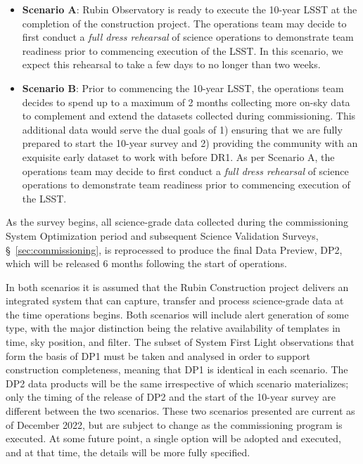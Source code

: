\begin{itemize}
\item \textbf{Scenario A}:
Rubin Observatory is ready to execute the 10-year LSST at the completion of the construction project. 
The operations team may decide to first conduct a \textit{full dress rehearsal} of science operations to demonstrate team readiness prior to commencing execution of the LSST.
In this scenario, we expect this rehearsal to take a few days to no longer than two weeks. 

\item \textbf{Scenario B}:
Prior to commencing the 10-year LSST, the operations team decides to spend up to a maximum of 2 months collecting more on-sky data to complement and extend the datasets collected during commissioning. 
This additional data would serve the dual goals of 1) ensuring that we are fully prepared to start the 10-year survey and 2) providing the community with an exquisite early dataset to work with before DR1. 
As per Scenario A, the operations team may decide to first conduct a \textit{full dress rehearsal} of science operations to demonstrate team readiness prior to commencing execution of the LSST. 
\end{itemize}
As the survey begins, all science-grade data collected during the commissioning System Optimization period and subsequent Science Validation Surveys, \S~\ref{sec:commissioning}, is reprocessed to produce the final Data Preview, DP2, which will be released 6 months following the start of operations.

In both scenarios it is assumed that the Rubin Construction project delivers an integrated system that can capture, transfer and process science-grade data at the time operations begins.
Both scenarios will include alert generation of some type, with the major distinction being the relative availability of templates in time, sky position, and filter. 
The subset of System First Light observations that form the basis of DP1 must be taken and analysed in order to support construction completeness, meaning that DP1 is identical in each scenario.
The DP2 data products will be the same irrespective of which scenario materializes; only the timing of the release of DP2 and the start of the 10-year survey are different between the two scenarios.
These two scenarios presented are current as of December 2022, but are subject to change as the commissioning program is executed.
At some future point, a single option will be adopted and executed, and at that time, the details will be more fully specified.

